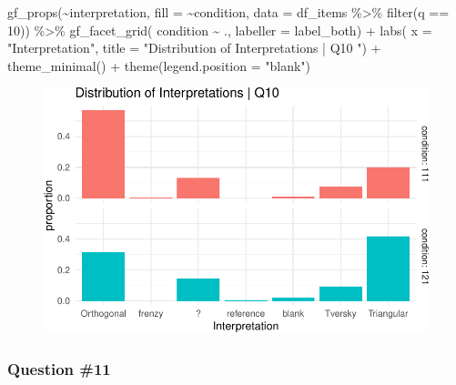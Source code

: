 \documentclass[
  letterpaper,
  DIV=11,
  numbers=noendperiod]{scrreprt}
\newenvironment{Shaded}{\begin{snugshade}}{\end{snugshade}}
\newcommand{\AttributeTok}[1]{\textcolor[rgb]{0.40,0.45,0.13}{#1}}
\newcommand{\DecValTok}[1]{\textcolor[rgb]{0.68,0.00,0.00}{#1}}
\newcommand{\FunctionTok}[1]{\textcolor[rgb]{0.28,0.35,0.67}{#1}}
\newcommand{\NormalTok}[1]{\textcolor[rgb]{0.00,0.23,0.31}{#1}}
\newcommand{\SpecialCharTok}[1]{\textcolor[rgb]{0.37,0.37,0.37}{#1}}
\newcommand{\StringTok}[1]{\textcolor[rgb]{0.13,0.47,0.30}{#1}}
\begin{document}
\begin{Shaded}
\begin{Highlighting}[]
\FunctionTok{gf\_props}\NormalTok{(}\SpecialCharTok{\textasciitilde{}}\NormalTok{interpretation, }\AttributeTok{fill =} \SpecialCharTok{\textasciitilde{}}\NormalTok{condition, }\AttributeTok{data =}\NormalTok{ df\_items }\SpecialCharTok{\%\textgreater{}\%} \FunctionTok{filter}\NormalTok{(q }\SpecialCharTok{==} \DecValTok{10}\NormalTok{)) }\SpecialCharTok{\%\textgreater{}\%} 
  \FunctionTok{gf\_facet\_grid}\NormalTok{( condition }\SpecialCharTok{\textasciitilde{}}\NormalTok{ ., }\AttributeTok{labeller =}\NormalTok{ label\_both) }\SpecialCharTok{+} 
  \FunctionTok{labs}\NormalTok{( }\AttributeTok{x =} \StringTok{"Interpretation"}\NormalTok{, }\AttributeTok{title =} \StringTok{"Distribution of Interpretations | Q10 "}\NormalTok{) }\SpecialCharTok{+} 
  \FunctionTok{theme\_minimal}\NormalTok{() }\SpecialCharTok{+} \FunctionTok{theme}\NormalTok{(}\AttributeTok{legend.position =} \StringTok{"blank"}\NormalTok{)}
\end{Highlighting}
\end{Shaded}

\begin{figure}[H]

{\centering \includegraphics{analysis/SGC3A/2_sgc3A_scoring_files/figure-pdf/Q10-distribution-2.pdf}

}

\end{figure}

\hypertarget{question-11}{%
\subsubsection{Question \#11}\label{question-11}}
\end{document}
